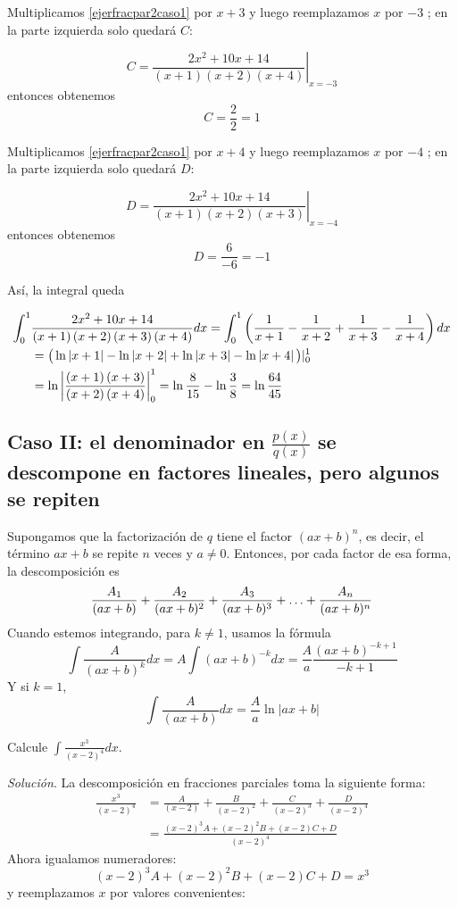 Multiplicamos \ref{ejerfracpar2caso1} por $x+3$ y luego reemplazamos $x$ por $-3$%
; en la parte izquierda solo quedará $C$:

$$C=\left. \frac{2x^{2}+10x+14}{\left( x+1\right) \left( x+2\right) \left(
x+4\right) }\right\vert _{x=-3}$$ entonces obtenemos $$C=\frac{2}{2}=1$$

Multiplicamos \ref{ejerfracpar2caso1} por $x+4$ y luego reemplazamos $x$ por $-4$%
; en la parte izquierda solo quedará $D$:

$$D=\left. \frac{2x^{2}+10x+14}{\left( x+1\right) \left( x+2\right) \left(
x+3\right) }\right\vert _{x=-4}$$ entonces obtenemos $$D=\frac{6}{-6}=-1$$

Así, la integral queda

{\footnotesize
\begin{align*}
\int_{0}^{1}&\frac{2x^{2}+10x+14}{\left( x+1\right) \left( x+2\right) \left(
x+3\right) \left( x+4\right) }dx=\int_{0}^{1}\left( \frac{1}{x+1}-\frac{1}{%
x+2}+\frac{1}{x+3}-\frac{1}{x+4}\right) dx
\\&=\big( \ln \left\vert
x+1\right\vert -\ln \left\vert x+2\right\vert +\ln \left\vert x+3\right\vert-\ln \left\vert x+4\right\vert \big)\vert _{0}^{1}
\\&=\ln \left\vert \frac{\left( x+1\right) \left( x+3\right) }{\left(
x+2\right) \left( x+4\right) }\right\vert _{0}^{1}=\ln \frac{8}{15}-\ln
\frac{3}{8}=\ln \frac{64}{45}
\end{align*}
}

\subsection*{Caso II: el denominador en $\frac{p(x)}{q(x)}$ se descompone en factores lineales, pero algunos se repiten}\label{repetidos}

Supongamos que la factorización de $q$ tiene el factor $(ax+b)^n$, es decir, el término $ax+b$ se repite $n$ veces y $a\ne0$. Entonces, por cada factor de esa forma, la descomposición es
\[
\frac{A_{1}}{(ax+b)}+\frac{A_{2}}{(ax+b)^{2}}+\frac{%
A_{3}}{(ax+b)^{3}}+\ldots+\frac{A_{n}}{(ax+b)^{n}}
\]
Cuando estemos integrando, para $k\ne 1$, usamos la fórmula
\[
\int \frac{A}{(ax+b)^{k}}dx=A\int (ax+b)^{-k}dx=\frac{A}{a}\frac{(ax+b)^{-k+1}}{-k+1}
\]
Y si $k= 1$,
\[
\int \frac{A}{\left( ax+b\right)}dx=\frac{A}{a}\ln\vert ax+b\vert
\]
\begin{ejemplo}
Calcule $\displaystyle{\int \frac{x^{3}}{(x-2)^{4}}dx}.$
\end{ejemplo}
\textit{Solución}. La descomposición en fracciones parciales toma la siguiente forma:
\begin{align*}
\frac{x^{3}}{(x-2)^{4}}&=\frac{A}{(x-2)}+\frac{B}{(x-2)^{2}}+%
\frac{C}{(x-2)^{3}}+\frac{D}{(x-2)^{4}} \\
&=\frac{(x-2)^{3}A+(x-2)^{2}B+(x-2)C+D}{(x-2)^{4}}
\end{align*}
Ahora igualamos numeradores:
\begin{equation}\label{Ejem2Fracc}
(x-2)^{3}A+(x-2)^{2}B+(x-2)C+D=x^{3}
\end{equation}
y reemplazamos $x$ por valores convenientes:

